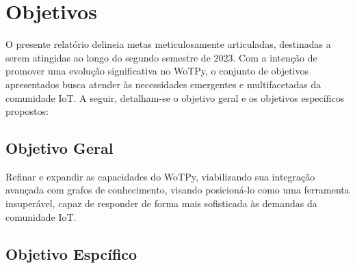 \chapter{Objetivos}

O presente relatório delineia metas meticulosamente articuladas, destinadas a serem atingidas ao longo do segundo semestre de 2023. Com a intenção de promover uma evolução significativa no WoTPy, o conjunto de objetivos apresentados busca atender às necessidades emergentes e multifacetadas da comunidade IoT. A seguir, detalham-se o objetivo geral e os objetivos específicos propostos:

\section{Objetivo Geral}

Refinar e expandir as capacidades do WoTPy, viabilizando sua integração avançada com grafos de conhecimento, visando posicioná-lo como uma ferramenta insuperável, capaz de responder de forma mais sofisticada às demandas da comunidade IoT.

\section{Objetivo Espcífico}

